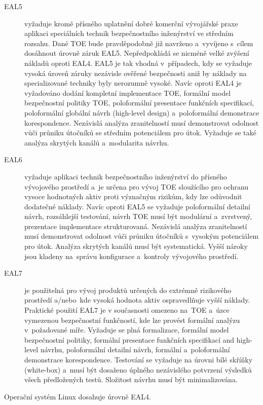 \documentclass[a4paper,12pt]{article}
\begin{document}
\begin{description}
 \item[EAL5]vyžaduje kromě přísného uplatnění dobré komerční vývojářské praxe aplikaci speciálních technik bezpečnostního inženýrství ve středním rozsahu. Dané TOE bude pravděpodobně již navrženo a~vyvíjeno s~cílem dosáhnout úrovně záruk EAL5. Nepředpokládá se nicméně velké zvýšení nákladů oproti EAL4. EAL5 je tak vhodná v~případech, kdy se vyžaduje vysoká úroveň záruky nezávisle ověřené bezpečnosti aniž by náklady na specializované techniky byly nerozumně vysoké. Navíc oproti EAL4 je vyžadováno dodání kompletní implementace TOE, formální model bezpečnostní politiky TOE, poloformální presentace funkčních specifikací, poloformální globální návrh (high-level design) a~poloformální demonstrace korespondence. Nezávislá analýza zranitelností musí demonstrovat odolnost vůči průniku útočníků se středním potenciálem pro útok. Vyžaduje se také analýza skrytých kanálů a~modularita návrhu.~\cite{NBUHodnoceniBezpecnostiSW}
 \item[EAL6] vyžaduje aplikaci technik bezpečnostního inženýrství do přísného vývojového prostředí a~je určena pro vývoj TOE sloužícího pro ochranu vysoce hodnotných aktiv proti význačným rizikům, kdy lze odůvodnit dodatečné náklady. Navíc oproti EAL5 se vyžaduje poloformální detailní návrh, rozsáhlejší testování, návrh TOE musí být modulární a~zvrstvený, prezentace implementace strukturovaná. Nezávislá analýza zranitelností musí demonstrovat odolnost vůči průniku útočníků s~vysokým potenciálem pro útok. Analýza skrytých kanálů musí být systematická. Vyšší nároky jsou kladeny na~správu konfigurace a~kontroly vývojového prostředí.~\cite{NBUHodnoceniBezpecnostiSW}
 \item[EAL7] je použitelná pro vývoj produktů určených do extrémně rizikového prostředí a/nebo~kde vysoká hodnota aktiv ospravedlňuje vyšší náklady. Praktické použití EAL7 je v současnosti omezeno na~TOE a~úzce vymezenou bezpečnostní funkčností, kde lze provést formální analýzu v~požadované míře. Vyžaduje se plná formalizace, formální model bezpečnostní politiky, formální presentace funkčních specifikací and high-level návrhu, poloformální detailní návrh, formální a~poloformální demonstrace korespondence. Testování se vyžaduje na úrovni bílé skříňky (white-box) a~musí být dosaženo úplného nezávislého potvrzení výsledků všech předložených testů. Složitost návrhu musí být minimalizována.~\cite{NBUHodnoceniBezpecnostiSW}
\end{description}
Operační systém Linux dosahuje úrovně EAL4.~\cite{CCredhat}~\cite{CCsuse}
\end{document}
